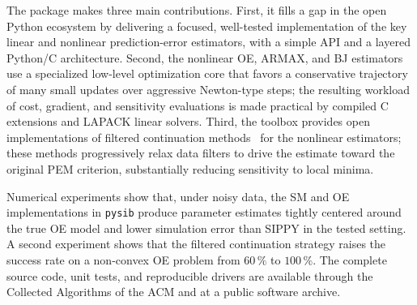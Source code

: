 \documentclass{ifacconf}
\begin{document}
The package makes three main contributions.
First, it fills a gap in the open Python ecosystem by delivering a
focused, well-tested implementation of the key linear and nonlinear
prediction-error estimators, with a simple API and a layered
Python/C architecture.
Second, the nonlinear OE, ARMAX, and BJ estimators use a specialized
low-level optimization core that favors a conservative trajectory of
many small updates over aggressive Newton-type steps; the resulting
workload of cost, gradient, and sensitivity evaluations is made
practical by compiled C extensions and LAPACK linear solvers.
Third, the toolbox provides open implementations of filtered
continuation methods~\cite{eckhard2013input,eckhard2017cost} for the
nonlinear estimators; these methods progressively relax data filters
to drive the estimate toward the original PEM criterion, substantially
reducing sensitivity to local minima.

Numerical experiments show that, under noisy data, the SM and OE
implementations in \texttt{pysib} produce parameter estimates tightly
centered around the true OE model and lower simulation error than SIPPY in
the tested setting.  A second experiment shows that the filtered
continuation strategy raises the success rate on a non-convex OE problem
from $60\,\%$ to $100\,\%$.
The complete source code, unit tests, and reproducible drivers are
available through the Collected Algorithms of the ACM and at a
public software archive.



\end{document}
